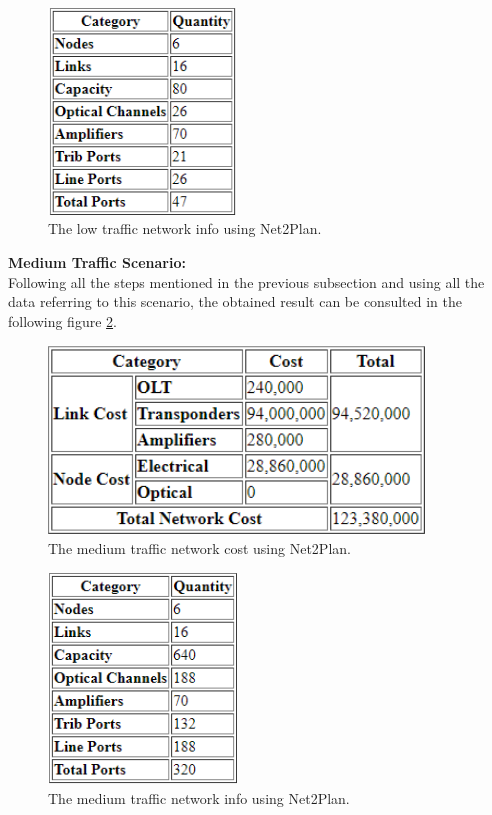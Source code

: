 \begin{figure}[h!]
\centering
\includegraphics[width=5cm]{sdf/heuristic/figures/Low_Network_Info_Opaque}
\caption{The low traffic network info using Net2Plan.}
\label{Low_Network_Info_Opaque}
\end{figure}

\newpage
\textbf{Medium Traffic Scenario:}\\

Following all the steps mentioned in the previous subsection and using all the data referring to this scenario, the obtained result can be consulted in the following figure \ref{Medium_Network_Cost_Opaque}.

\begin{figure}[h!]
\centering
\includegraphics[width=10cm]{sdf/heuristic/figures/Medium_Network_Cost_Opaque}
\caption{The medium traffic network cost using Net2Plan.}
\label{Medium_Network_Cost_Opaque}
\end{figure}

\begin{figure}[h!]
\centering
\includegraphics[width=5cm]{sdf/heuristic/figures/Medium_Network_Info_Opaque}
\caption{The medium traffic network info using Net2Plan.}
\label{Medium_Network_Info_Opaque}
\end{figure}

